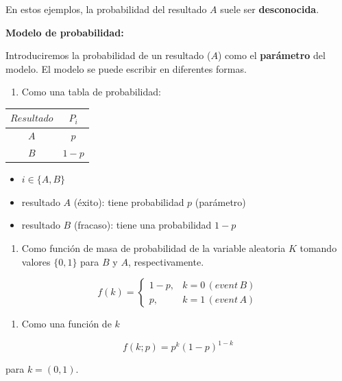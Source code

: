 \documentclass[
]{book}
\providecommand{\tightlist}{%
  \setlength{\itemsep}{0pt}\setlength{\parskip}{0pt}}
\begin{document}
En estos ejemplos, la probabilidad del resultado \(A\) suele ser \textbf{desconocida}.

\textbf{Modelo de probabilidad:}

Introduciremos la probabilidad de un resultado (\(A\)) como el \textbf{parámetro} del modelo. El modelo se puede escribir en diferentes formas.

\begin{enumerate}
\def\labelenumi{\arabic{enumi})}
\tightlist
\item
  Como una tabla de probabilidad:
\end{enumerate}

\begin{longtable}[]{@{}cc@{}}
\toprule\noalign{}
\(Resultado\) & \(P_i\) \\
\midrule\noalign{}
\endhead
\bottomrule\noalign{}
\endlastfoot
\(A\) & \(p\) \\
\(B\) & \(1-p\) \\
\end{longtable}

\begin{itemize}
\tightlist
\item
  \(i \in \{A,B\}\)
\item
  resultado \(A\) (éxito): tiene probabilidad \(p\) (parámetro)
\item
  resultado \(B\) (fracaso): tiene una probabilidad \(1-p\)
\end{itemize}

\begin{enumerate}
\def\labelenumi{\arabic{enumi})}
\setcounter{enumi}{1}
\tightlist
\item
  Como función de masa de probabilidad de la variable aleatoria \(K\) tomando valores \(\{0, 1\}\) para \(B\) y \(A\), respectivamente.
\end{enumerate}

\[
    f(k)= 
\begin{cases}
    1-p,&  k=0\, (event\, B)\\
    p,& k=1\, (event\, A) 
\end{cases}
\]

\begin{enumerate}
\def\labelenumi{\arabic{enumi})}
\setcounter{enumi}{2}
\tightlist
\item
  Como una función de \(k\)
\end{enumerate}

\[f(k; p)=p^k(1-p)^{1-k} \]

para \(k=(0,1)\).
\end{document}
